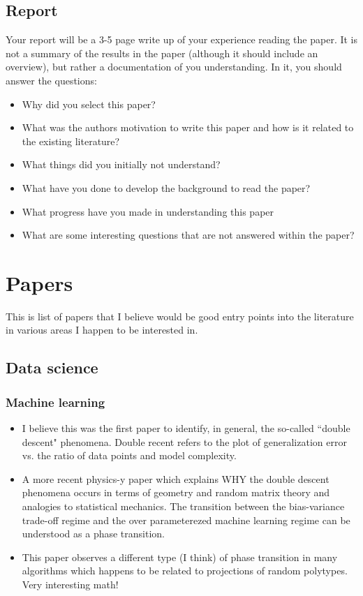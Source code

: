 \documentclass{amsart}
\begin{document}
\subsection{Report}

Your report will be a 3-5 page write up of your experience reading the paper. It is not a summary of the results in the paper (although it should include an overview), but rather a documentation of you understanding. In it, you should answer the questions:
\begin{itemize}
\item  Why did you select this paper?   
\item  What was the authors motivation to write this paper and how is it related to the existing literature? 
\item  What things did you initially not understand? 
\item  What have you done to develop the background to read the paper? 
\item  What progress have you made in understanding this paper 
\item  What are some interesting questions that are not answered within the paper?   
\end{itemize}

\section{Papers}\label{sec:papers}
This is list of papers that I believe would be good entry points into the literature in various areas I happen to be interested in. 

\subsection{Data science}
\subsubsection{Machine learning}
\begin{itemize}
\item \cite{Belkin2019} I believe this was the first paper to identify, in general, the so-called ``double descent" phenomena. Double recent refers to the plot of generalization error vs. the ratio of data points and model complexity. 
\item \cite{?} A more recent physics-y paper which explains WHY the double descent phenomena occurs in terms of geometry and random matrix theory and analogies to statistical mechanics. The transition between the bias-variance trade-off regime and the over parameterezed machine learning regime can be understood as a phase transition. 
\item \cite{Donoho2009aa} This paper observes a different type (I think) of phase transition in many algorithms which happens to be related to projections of random polytypes. Very interesting math! 
\end{itemize}
\end{document}
